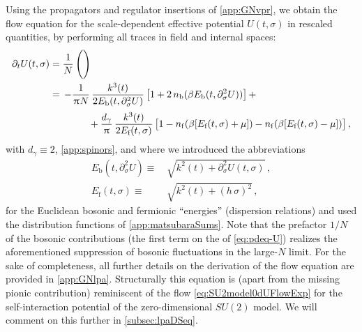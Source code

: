Using the propagators and regulator insertions of \cref{app:GNvpr}, we obtain the \lpa{} flow equation for the scale-dependent effective potential $U ( t, \sigma )$ in rescaled quantities, by performing all traces in field and internal spaces:
\begin{align}
	\partial_t U ( t,  \sigma ) &= \frac{1}{N} \, \Bigg(
	
	\Bigg)\\ 
	&= \, - \frac{1}{\piu N} \, \frac{k^3 ( t )}{2 E_{\textrm{b}} ( t, \partial^2_\sigma U )} \, \big[ 1 + 2 \, n_\mathrm{b} ( \beta E_{\textrm{b}} ( t, \partial^2_\sigma U ) ) \big] \,+ \notag\\*[.2em] %
	& \qquad\qquad + \frac{d_\gamma}{\piu} \, \frac{k^3 ( t )}{2 E_{\textrm{f}}  ( t, \sigma )} \, \big[ 1 - n_\mathrm{f} ( \beta [ E_{\textrm{f}}  ( t, \sigma ) + \mu ] ) - n_\mathrm{f} ( \beta [ E_{\textrm{f}}  ( t, \sigma ) - \mu ] ) \big] \, ,		\label{eq:pdeq-U}
\end{align}
with $d_\gamma\equiv 2$, \cf{} \cref{app:spinors}, and where we introduced the abbreviations
\begin{subequations}
\begin{align}
	E_\mathrm{b} ( t, \partial^2_\sigma U ) \equiv \, & \sqrt{ k^2 ( t ) + \partial_\sigma^2 U ( t, \sigma ) } \, ,		\label{eq:Eb}
	\\[.2em]
	E_\mathrm{f} ( t, \sigma ) \equiv \, & \sqrt{ k^2 ( t ) + ( h \, \sigma )^2 } \, ,	\label{eq:Ef}
\end{align}
\end{subequations}
for the Euclidean bosonic and fermionic ``energies'' (dispersion relations) and used the distribution functions of \cref{app:matsubaraSums}.
Note that the prefactor $1/N$ of the bosonic contributions (the first term on the \rhs{} of \cref{eq:pdeq-U}) realizes the aforementioned suppression of bosonic fluctuations in the large-$N$ limit.
For the sake of completeness, all further details on the derivation of the flow equation are provided in \cref{app:GNlpa}.
Structurally this equation is (apart from the missing pionic contribution) reminiscent of the flow \cref{eq:SU2model0dUFlowExp} for the self-interaction potential of the zero-dimensional $SU(2)$ model.
We will comment on this further in \cref{subsec:lpaDSeq}.\bigskip
	
